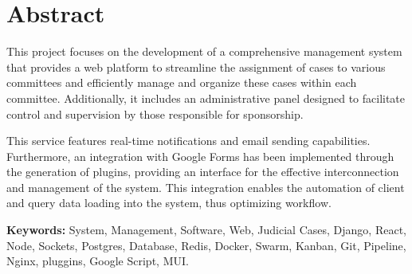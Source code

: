 
\chapter*{Abstract}

This project focuses on the development of a comprehensive management system that provides a web platform to streamline the assignment of cases to various committees and efficiently manage and organize these cases within each committee. Additionally, it includes an administrative panel designed to facilitate control and supervision by those responsible for sponsorship.

This service features real-time notifications and email sending capabilities. Furthermore, an integration with Google Forms has been implemented through the generation of plugins, providing an interface for the effective interconnection and management of the system. This integration enables the automation of client and query data loading into the system, thus optimizing workflow.

\vspace{.5cm}

\textbf{Keywords:} System, Management, Software, Web, Judicial Cases, Django, React, Node, Sockets, Postgres, Database, Redis, Docker, Swarm, Kanban, Git, Pipeline, Nginx, pluggins, Google Script, MUI.


\vspace{.5cm}
